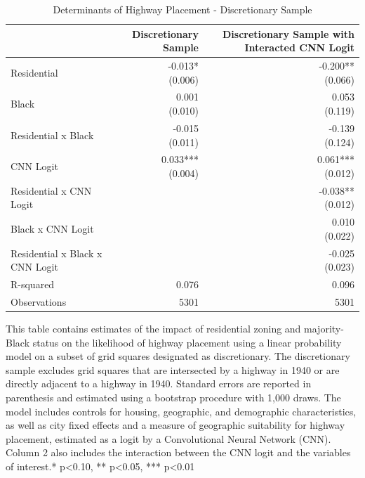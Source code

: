 \begin{table}[h]
\centering
\caption{Determinants of Highway Placement - Discretionary Sample}
\label{tab:discretionary_sample_results}
\begin{threeparttable}
\begin{tabular*}{1.0\textwidth}{@{\extracolsep{\fill}}l*{2}{r}}
\toprule
 & Discretionary Sample & Discretionary Sample with Interacted CNN Logit \\
\midrule
Residential & \makecell[tr]{-0.013{*} \\ (0.006)} & \makecell[tr]{-0.200{**} \\ (0.066)} \\
Black & \makecell[tr]{0.001 \\ (0.010)} & \makecell[tr]{0.053 \\ (0.119)} \\
Residential x Black & \makecell[tr]{-0.015 \\ (0.011)} & \makecell[tr]{-0.139 \\ (0.124)} \\
CNN Logit & \makecell[tr]{0.033{***} \\ (0.004)} & \makecell[tr]{0.061{***} \\ (0.012)} \\
Residential x CNN Logit &  & \makecell[tr]{-0.038{**} \\ (0.012)} \\
Black x CNN Logit &  & \makecell[tr]{0.010 \\ (0.022)} \\
Residential x Black x CNN Logit &  & \makecell[tr]{-0.025 \\ (0.023)} \\
R-squared & 0.076 & 0.096 \\
Observations & 5301 & 5301 \\
\bottomrule
\end{tabular*}
\begin{tablenotes}[flushleft]
\footnotesize
\item This table contains estimates of the impact of residential zoning and majority-Black status on the likelihood of highway placement using a linear probability model on a subset of grid squares designated as discretionary. The discretionary sample excludes grid squares that are intersected by a highway in 1940 or are directly adjacent to a highway in 1940. Standard errors are reported in parenthesis and estimated using a bootstrap procedure with 1,000 draws. The model includes controls for housing, geographic, and demographic characteristics, as well as city fixed effects and a measure of geographic suitability for highway placement, estimated as a logit by a Convolutional Neural Network (CNN). Column 2 also includes the interaction between the CNN logit and the variables of interest.* p<0.10, ** p<0.05, *** p<0.01
\end{tablenotes}
\end{threeparttable}
\end{table}
